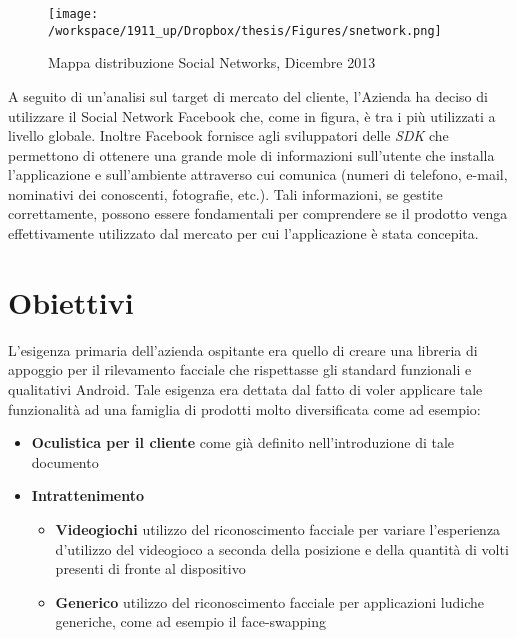 \begin{figure}[H]\centering  
\texttt{[image: /workspace/1911\_up/Dropbox/thesis/Figures/snetwork.png]}
\caption[Mappa distribuzione Social Networks]{Mappa distribuzione Social Networks, Dicembre 2013}
\label{pic-a}
\end{figure}

A seguito di un'analisi sul target di mercato del cliente, l'Azienda ha deciso di utilizzare il Social Network Facebook che, come in figura, è tra i più utilizzati a livello globale. Inoltre Facebook fornisce agli sviluppatori delle \textit{SDK} che permettono di ottenere una grande mole di informazioni sull'utente che installa l'applicazione e sull'ambiente attraverso cui comunica (numeri di telefono, e-mail, nominativi dei conoscenti, fotografie, etc.). Tali informazioni, se gestite correttamente, possono essere fondamentali per comprendere se il prodotto venga effettivamente utilizzato dal mercato per cui l'applicazione è stata concepita.


\section{Obiettivi}

L'esigenza primaria dell'azienda ospitante era quello di creare una libreria di appoggio per il rilevamento facciale che rispettasse gli standard funzionali e qualitativi Android. Tale esigenza era dettata dal fatto di voler applicare tale funzionalità ad una famiglia di prodotti molto diversificata come ad esempio:

\begin{itemize}
\item \textbf{Oculistica per il cliente} come già definito nell'introduzione di tale documento
\item \textbf{Intrattenimento}
\begin{itemize}
\item \textbf{Videogiochi} 
utilizzo del riconoscimento facciale per variare l'esperienza d'utilizzo del videogioco a seconda della posizione e della quantità di volti presenti di fronte al dispositivo
\item \textbf{Generico}
utilizzo del riconoscimento facciale per applicazioni ludiche generiche, come ad esempio il face-swapping
\end{itemize}
\end{itemize}  

